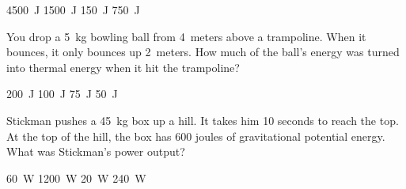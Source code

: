 \documentclass[answers]{exam}
\begin{document}
\begin{questions}
\begin{minipage}{0.3\textwidth}
    \centering
    \begin{randomizechoices}[norandomize]
        \choice \SI{4500}{J}
        \correctchoice \SI{1500}{J}
        \choice \SI{150}{J}
        \choice \SI{750}{J}
    \end{randomizechoices}
\end{minipage}%
\begin{minipage}{0.4\textwidth}
    \centering
\end{minipage}

\question
You drop a \SI{5}{kg} bowling ball from \SI{4}{meters} above a trampoline. When it bounces, it only bounces up \SI{2}{meters}. How much of the ball's energy was turned into thermal energy when it hit the trampoline?

\begin{randomizechoices}[norandomize]
    \choice \SI{200}{J}
    \correctchoice \SI{100}{J}
    \choice \SI{75}{J}
    \choice \SI{50}{J}
\end{randomizechoices}

\question
Stickman pushes a \SI{45}{kg} box up a hill. It takes him 10 seconds to reach the top. At the top of the hill, the box has 600 joules of gravitational potential energy. What was Stickman's power output?
\bigskip

\begin{minipage}{0.3\textwidth}
    \begin{randomizechoices}[norandomize]
        \correctchoice \SI{60}{W}
        \choice \SI{1200}{W}
        \choice \SI{20}{W}
        \choice \SI{240}{W}
    \end{randomizechoices}
\end{minipage}%
\begin{minipage}{0.6\textwidth}
\end{minipage}


\end{questions}
\end{document}
